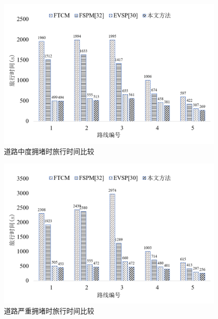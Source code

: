 \begin{figure}[H]
	\centering
	\includegraphics[width=\linewidth]{figures/travel_time3.png}
	\caption{道路中度拥堵时旅行时间比较}
	\label{fig:travel_time_moderate_congestion}
\end{figure}


\begin{figure}
	\centering
	\includegraphics[width=\linewidth]{figures/travel_time4.png}
	\caption{道路严重拥堵时旅行时间比较}
	\label{fig:travel_time_severe_congestion}
\end{figure}


